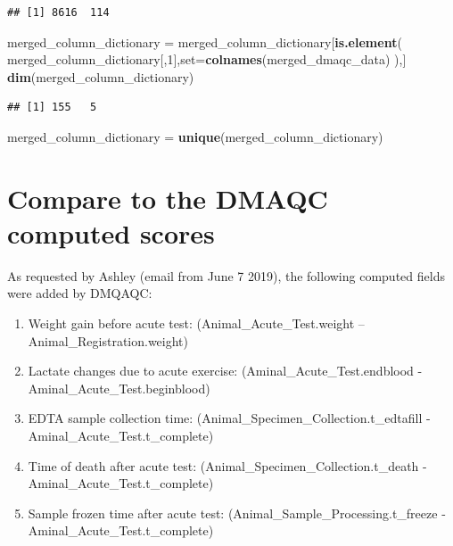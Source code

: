 \documentclass[]{article}
\newenvironment{Shaded}{\begin{snugshade}}{\end{snugshade}}
\newcommand{\KeywordTok}[1]{\textcolor[rgb]{0.13,0.29,0.53}{\textbf{#1}}}
\newcommand{\DataTypeTok}[1]{\textcolor[rgb]{0.13,0.29,0.53}{#1}}
\newcommand{\DecValTok}[1]{\textcolor[rgb]{0.00,0.00,0.81}{#1}}
\newcommand{\StringTok}[1]{\textcolor[rgb]{0.31,0.60,0.02}{#1}}
\newcommand{\NormalTok}[1]{#1}
\providecommand{\tightlist}{%
  \setlength{\itemsep}{0pt}\setlength{\parskip}{0pt}}
\begin{document}
\begin{verbatim}
## [1] 8616  114
\end{verbatim}

\begin{Shaded}
\begin{Highlighting}[]
\NormalTok{merged_column_dictionary =}\StringTok{ }\NormalTok{merged_column_dictionary[}\KeywordTok{is.element}\NormalTok{(}
\NormalTok{  merged_column_dictionary[,}\DecValTok{1}\NormalTok{],}\DataTypeTok{set=}\KeywordTok{colnames}\NormalTok{(merged_dmaqc_data)}
\NormalTok{  ),]}
\KeywordTok{dim}\NormalTok{(merged_column_dictionary)}
\end{Highlighting}
\end{Shaded}

\begin{verbatim}
## [1] 155   5
\end{verbatim}

\begin{Shaded}
\begin{Highlighting}[]
\NormalTok{merged_column_dictionary =}\StringTok{ }\KeywordTok{unique}\NormalTok{(merged_column_dictionary)}
\end{Highlighting}
\end{Shaded}

\section{Compare to the DMAQC computed
scores}\label{compare-to-the-dmaqc-computed-scores}

As requested by Ashley (email from June 7 2019), the following computed
fields were added by DMQAQC:

\begin{enumerate}
\def\labelenumi{\arabic{enumi}.}
\tightlist
\item
  Weight gain before acute test: (Animal\_Acute\_Test.weight --
  Animal\_Registration.weight)
\item
  Lactate changes due to acute exercise: (Aminal\_Acute\_Test.endblood -
  Aminal\_Acute\_Test.beginblood)
\item
  EDTA sample collection time: (Animal\_Specimen\_Collection.t\_edtafill
  - Aminal\_Acute\_Test.t\_complete)
\item
  Time of death after acute test: (Animal\_Specimen\_Collection.t\_death
  - Aminal\_Acute\_Test.t\_complete)
\item
  Sample frozen time after acute test:
  (Animal\_Sample\_Processing.t\_freeze -
  Aminal\_Acute\_Test.t\_complete)
\end{enumerate}
\end{document}
